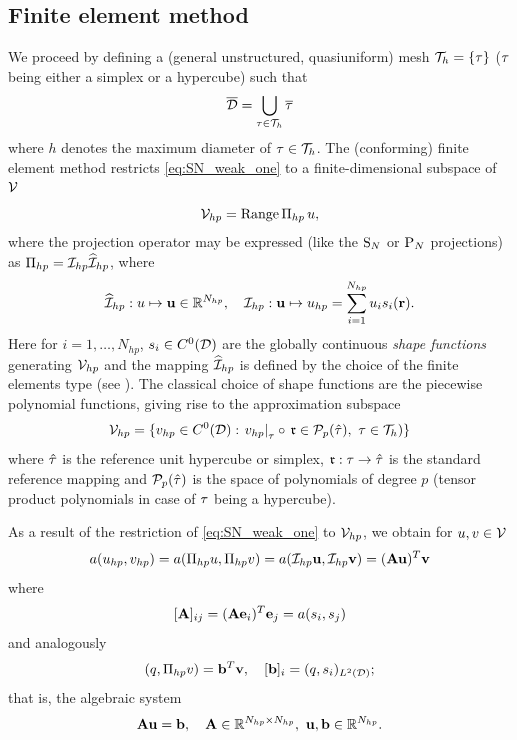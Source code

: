 \subsection{Finite element method}
We proceed by defining a (general unstructured, quasiuniform) mesh
$\mesh = \{\elem\}$ ($\elem$ being either a simplex or a hypercube) such that $$
	\overline{\VV} = \bigcup_{\elem\in\mesh} \overline\elem
$$ where $h$ denotes
the maximum diameter of $\elem\in\mesh$. The (conforming) finite element
method restricts \eqref{eq:SN_weak_one} to a finite-dimensional subspace of $\Space$
\begin{equation}\label{eq:mesh}
	\Space_{hp} = \Rng \Projop[hp]\,u,
\end{equation}
where the projection operator may be expressed (like the $\SN$ or $\PN$ projections) as 
$\Projop[hp] = \PiHP\PihHP$, where
$$
	\PihHP : u \mapsto \mathbf{u} \in \R[N_{hp}], \quad \PiHP : \mathbf{u} \mapsto u_{hp} = \sum_{i=1}^{N_{hp}} u_i
	s_i(\br).
$$
Here for $i = 1,\ldots,N_{hp}$, $s_i \in C^0(\VV)$ are the globally continuous \textit{shape functions} generating
$\Space_{hp}$ and the mapping $\PihHP$ is defined by the choice of the finite
elements type (see \cite[Chap. 3]{dolfin1}).
The classical choice of shape functions are the piecewise polynomial functions, giving rise to the approximation
subspace
\begin{equation}\label{eq:space}
	\Space_{hp} = \{v_{hp} \in C^0(\VV): \left. v_{hp}\right\vert_{\elem} \circ\, \mathfrak{r} \in
	\mathcal{P}_p(\hat{\elem}),\ \elem\in\mesh)
	\}
\end{equation}
where $\hat{\elem}$ is the reference unit hypercube or simplex, $\mathfrak{r} : \elem \to \hat{\elem} $
is the standard reference mapping and $\mathcal{P}_p(\hat{\elem})$ is the space of polynomials of degree $p$ (tensor
product polynomials in case of $\elem$ being a hypercube).

As a result of the restriction of \eqref{eq:SN_weak_one} to $\Space_{hp}$, we obtain for $u,v\in\Space$
\begin{equation}\label{eq:aaa}
	a(u_{hp}, v_{hp}) = a(\Projop[hp]u, \Projop[hp]v) = a(\PiHP \mathbf{u}, \PiHP \mathbf{v}) =
	(\mathbf{A}\mathbf{u})^T\mathbf{v}
\end{equation}
where
$$
	[\mat{A}]_{ij} = (\mat{A}\mat{e}_i)^T\mat{e}_j = a(s_i, s_j) 
$$
and analogously 
$$
	(q,\Projop[hp] v) = \mat{b}^T \mat{v}, \quad [\mat{b}]_i = (q, s_i)_{\Lp[2](\VV)};
$$
that is, the algebraic system
$$
	\mathbf{A}\mathbf{u} = \mathbf{b},\quad \mathbf{A} \in \R[N_{hp}\times N_{hp}], \ \mat{u},\mat{b} \in \R[N_{hp}].
$$


